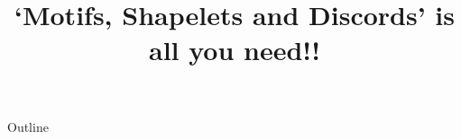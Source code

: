 \documentclass[xcolor=dvipsnames,compress,t,pdf,9pt]{beamer}
\title[\insertframenumber /\inserttotalframenumber]{`Motifs, Shapelets and Discords' is all you need!!}
\begin{document}
	\begin{frame}
	\titlepage
	\end{frame}
	
	\begin{frame}{Outline}
	    \tableofcontents
	\end{frame}

	
    
	
	
\end{document}
